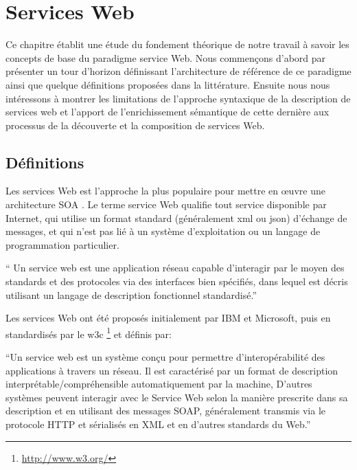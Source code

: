 \chapter{Services Web}
\label{ch:web-service}
Ce chapitre établit une étude du fondement théorique de notre travail
à savoir les concepts de base du paradigme service Web.  Nous
commençons d'abord par présenter un tour d'horizon définissant
l'architecture de référence de ce paradigme ainsi que quelque
définitions proposées dans la littérature. Ensuite nous nous
intéressons à montrer les limitations de l'approche syntaxique de la
description de services web et l'apport de l'enrichissement sémantique
de cette dernière aux processus de la découverte et la composition de
services Web.
\newpage
\section{Définitions}
\label{sec:ws-notions-de-base}

Les services Web est l'approche la plus populaire pour mettre en œuvre
une architecture SOA . Le terme service Web qualifie tout service
disponible par Internet, qui utilise un format standard (généralement
\acrshort{xml} ou \acrshort{json}) d'échange de messages, et qui n'est
pas lié à un système d'exploitation ou un langage de programmation
particulier.


\begin{mydef}  `` Un
  service web est une application réseau capable d'interagir par le
  moyen des standards et des protocoles via des interfaces bien
  spécifiés, dans lequel est décris utilisant un langage de
  description fonctionnel standardisé.''
\end{mydef}

Les services Web ont été proposés initialement par IBM
\cite{kreger2001web} et Microsoft, puis en standardisés par le
\acrshort{w3c} \footnote{\url{http://www.w3.org/}} et définis
\cite{WSA} par:

\begin{mydef}
  ``Un service web est un système conçu pour permettre
  d'interopérabilité des applications à travers un réseau.  Il est
  caractérisé par un format de description
  interprétable/compréhensible automatiquement par la machine,
  D'autres systèmes peuvent interagir avec le Service Web selon la
  manière prescrite dans sa description et en utilisant des messages
  SOAP, généralement transmis via le protocole HTTP et sérialisés en
  XML et en d'autres standards du Web.''
\end{mydef}

